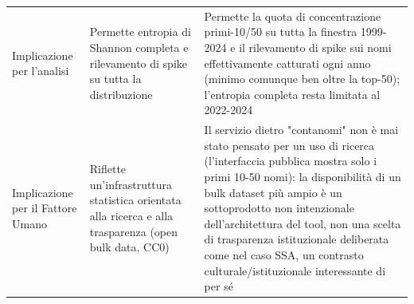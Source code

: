 \begin{table}[t]
\begin{tabular}{>{\raggedright\arraybackslash}p{3.2cm} >{\raggedright\arraybackslash}p{6.3cm} >{\raggedright\arraybackslash}p{6.3cm}}
Implicazione per l'analisi & Permette entropia di Shannon completa e rilevamento di spike su tutta la distribuzione & Permette la quota di concentrazione primi-10/50 su tutta la finestra 1999-2024 e il rilevamento di spike sui nomi effettivamente catturati ogni anno (minimo comunque ben oltre la top-50); l'entropia completa resta limitata al 2022-2024 \\
Implicazione per il Fattore Umano & Riflette un'infrastruttura statistica orientata alla ricerca e alla trasparenza (open bulk data, CC0) & Il servizio dietro "contanomi" non è mai stato pensato per un uso di ricerca (l'interfaccia pubblica mostra solo i primi 10-50 nomi): la disponibilità di un bulk dataset più ampio è un sottoprodotto non intenzionale dell'architettura del tool, non una scelta di trasparenza istituzionale deliberata come nel caso SSA, un contrasto culturale/istituzionale interessante di per sé \\
\bottomrule
\end{tabular}
\end{table}
